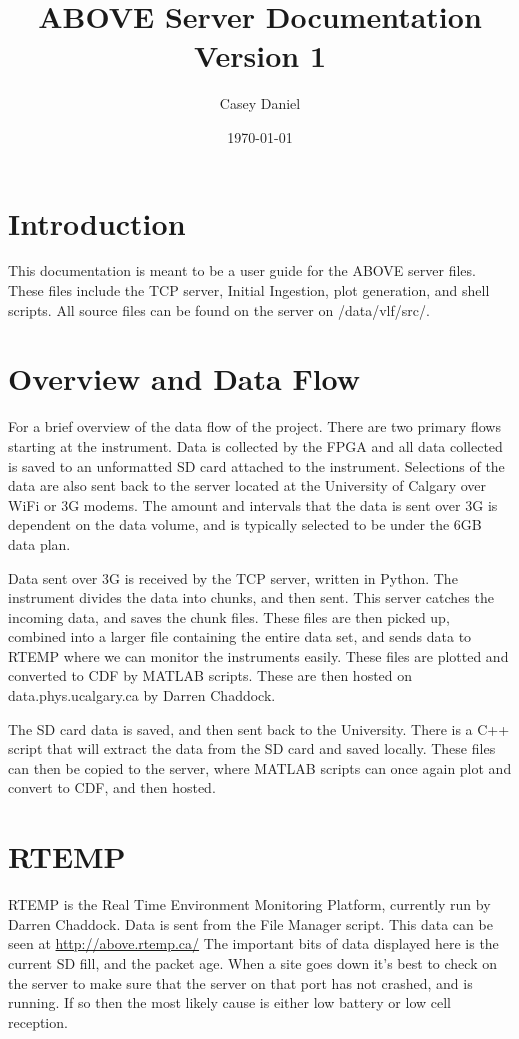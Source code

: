 \documentclass{article}
\title{ABOVE Server Documentation \\ Version 1}
\date{\today}
\author{Casey Daniel}
\begin{document}
\maketitle
\newpage 
\tableofcontents
\newpage
\section{Introduction}

This documentation is meant to be a user guide for the ABOVE server files. These files include the TCP server, Initial Ingestion, plot generation, and shell scripts. All source files can be found on the server on /data/vlf/src/.

\section{Overview and Data Flow}
For a brief overview of the data flow of the project. There are two primary flows starting at the instrument. Data is collected by the FPGA and all data collected is saved to an unformatted SD card attached to the instrument. Selections of the data are also sent back to the server located at the University of Calgary over WiFi or 3G modems. The amount and intervals that the data is sent over 3G is dependent on the data volume, and is typically selected to be under the 6GB data plan. 

Data sent over 3G is received by the TCP server, written in Python. The instrument divides the data into chunks, and then sent. This server catches the incoming data, and saves the chunk files. These files are then picked up, combined into a larger file containing the entire data set, and sends data to RTEMP where we can monitor the instruments easily. These files are plotted and converted to CDF by MATLAB scripts. These are then hosted on data.phys.ucalgary.ca by Darren Chaddock.

The SD card data is saved, and then sent back to the University. There is a C++ script that will extract the data from the SD card and saved locally. These files can then be copied to the server, where MATLAB scripts can once again plot and convert to CDF, and then hosted. 


\section{RTEMP}
RTEMP is the Real Time Environment Monitoring Platform, currently run by Darren Chaddock. Data is sent from the File Manager script. This data can be seen at \url{http://above.rtemp.ca/} The important bits of data displayed here is the current SD fill, and the packet age. When a site goes down it's best to check on the server to make sure that the server on that port has not crashed, and is running. If so then the most likely cause is either low battery or low cell reception.
\end{document}
